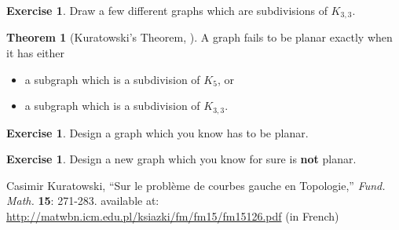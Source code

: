 \documentclass[12pt,letterpaper]{article}
\theoremstyle{definition}
\newtheorem{exercise}[question]{Exercise}
\newtheorem{theorem}{Theorem}
\begin{document}
\begin{exercise}
Draw a few different graphs which are subdivisions of $K_{3,3}$.
\end{exercise}


\begin{theorem}[Kuratowski's Theorem, \cite{kuratowski}]
A graph fails to be planar exactly when it has either 
\begin{itemize}
\item a subgraph which is a subdivision of $K_5$, or
\item a subgraph which is a subdivision of $K_{3,3}$.
\end{itemize}
\end{theorem}


\begin{exercise}
Design a graph which you know has to be planar.
\end{exercise}

\begin{exercise}
Design a new graph which you know for sure is \textbf{not} planar.
\end{exercise}

\begin{thebibliography}{9}

  Casimir Kuratowski,
  ``Sur le {probl\`{e}me} de courbes gauche en Topologie,''
  \emph{Fund. Math.} \textbf{15}: 271-283.
  available at: \url{http://matwbn.icm.edu.pl/ksiazki/fm/fm15/fm15126.pdf}
  (in French)

\end{thebibliography}
\end{document}
